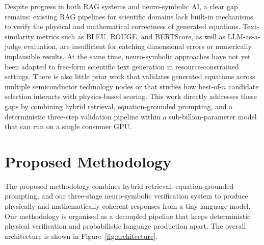 \documentclass[a4paper,fleqn]{cas-sc}
\begin{document}
Despite progress in both RAG systems and neuro-symbolic AI, a clear gap remains: existing RAG pipelines for scientific domains lack built-in mechanisms to verify the physical and mathematical correctness of generated equations. Text-similarity metrics such as BLEU, ROUGE, and BERTScore, as well as LLM-as-a-judge evaluation, are insufficient for catching dimensional errors or numerically implausible results. At the same time, neuro-symbolic approaches have not yet been adapted to free-form scientific text generation in resource-constrained settings. There is also little prior work that validates generated equations across multiple semiconductor technology nodes or that studies how best-of-$n$ candidate selection interacts with physics-based scoring. This work directly addresses these gaps by combining hybrid retrieval, equation-grounded prompting, and a deterministic three-step validation pipeline within a sub-billion-parameter model that can run on a single consumer GPU.


\section{Proposed Methodology}
The proposed methodology combines hybrid retrieval, equation-grounded prompting, and our three-stage neuro-symbolic verification system to produce physically and mathematically coherent responses from a tiny language model. Our methodology is organised as a decoupled pipeline that keeps deterministic physical verification and probabilistic language production apart.  The overall architecture is shown in Figure~\ref{fig:architecture}.
\end{document}

